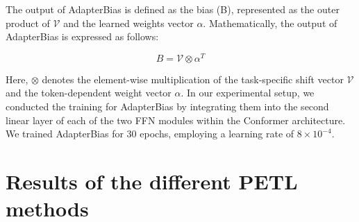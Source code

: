The output of AdapterBias is defined as the bias (B), represented as the outer product of $\mathcal{V}$ and the learned weights vector $\alpha$. Mathematically, the output of AdapterBias is expressed as follows:

\begin{equation}
    B = \mathcal{V} \otimes \alpha^T    
\end{equation}

Here, \(\otimes\) denotes the element-wise multiplication of the task-specific shift vector \(\mathcal{V}\) and the token-dependent weight vector \(\alpha\).
In our experimental setup, we conducted the training for AdapterBias by integrating them into the second linear layer of each of the two FFN modules within the Conformer architecture. We trained AdapterBias for 30 epochs, employing a learning rate of $8 \times 10^{-4}$.

\section{Results of the different PETL methods}

